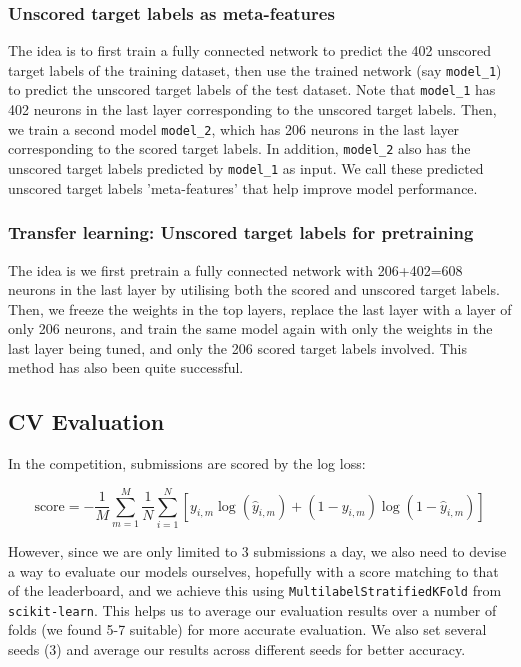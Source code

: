 \documentclass{article}
\begin{document}
\subsubsection{Unscored target labels as meta-features}
The idea is to first train a fully connected network to predict the 402 unscored target labels of the training dataset, then use the trained network (say \texttt{model\_1}) to predict the unscored target labels of the test dataset. Note that \texttt{model\_1} has 402 neurons in the last layer corresponding to the unscored target labels. Then, we train a second model \texttt{model\_2}, which has 206 neurons in the last layer corresponding to the scored target labels. In addition, \texttt{model\_2} also has the unscored target labels predicted by \texttt{model\_1} as input. We call these predicted unscored target labels 'meta-features' that help improve model performance. 

\subsubsection{Transfer learning: Unscored target labels for pretraining}
The idea is we first pretrain a fully connected network with 206+402=608 neurons in the last layer by utilising both the scored and unscored target labels. Then, we freeze the weights in the top layers, replace the last layer with a layer of only 206 neurons, and train the same model again with only the weights in the last layer being tuned, and only the 206 scored target labels involved. This method has also been quite successful.

\subsection{CV Evaluation}
In the competition, submissions are scored by the log loss:

$$ \text{score} = - \frac{1}{M}\sum_{m=1}^{M} \frac{1}{N} \sum_{i=1}^{N} \left[ y_{i,m} \log(\hat{y}_{i,m}) + (1 - y_{i,m}) \log(1 - \hat{y}_{i,m})\right] $$

However, since we are only limited to 3 submissions a day, we also need to devise a way to evaluate our models ourselves, hopefully with a score matching to that of the leaderboard, and we achieve this using \texttt{MultilabelStratifiedKFold} from \texttt{scikit-learn}. This helps us to average our evaluation results over a number of folds (we found 5-7 suitable) for more accurate evaluation. We also set several seeds (3) and average our results across different seeds for better accuracy.
\end{document}
